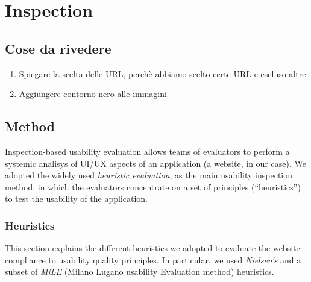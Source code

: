 

\section{Inspection}

\subsection{Cose da rivedere}
\begin{enumerate}
    \item Spiegare la scelta delle URL, perch\`e abbiamo scelto certe URL e escluso altre
    \item Aggiungere contorno nero alle immagini
\end{enumerate}

\subsection{Method}
Inspection-based usability evaluation allows teams of evaluators to perform
a systemic analisys of UI/UX aspects of an application (a website, in our case).
We adopted the widely used \emph{heuristic evaluation}, as the main usability inspection method, in which the evaluators concentrate on a set of principles (``heuristics'') to test the usability of the application.

\subsubsection{Heuristics}

This section explains the different heuristics we adopted to evaluate the
website compliance to usability quality principles. In particular, we used
\emph{Nielsen's} and a subset of \emph{MiLE} (Milano Lugano usability Evaluation method) heuristics.

